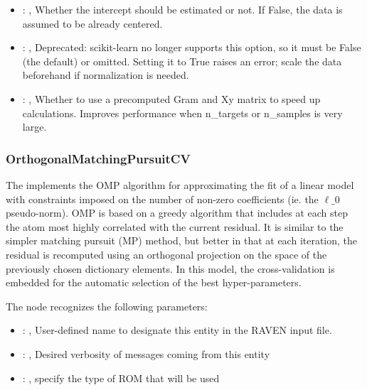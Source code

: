 \begin{itemize}
    \item {}: ,
      Whether the intercept should be estimated or not. If False,
      the data is assumed to be already centered.

    \item {}: ,
      Deprecated: scikit-learn no longer supports this option, so it must be False (the default) or
      omitted.                                                  Setting it to True raises an error;
      scale the data beforehand if normalization is needed.

    \item {}: ,
      Whether to use a precomputed Gram and Xy matrix to speed up calculations.
      Improves performance when n\_targets or n\_samples is very large.
  \end{itemize}


\subsubsection{OrthogonalMatchingPursuitCV}
  The                          implements the OMP algorithm for
  approximating the fit of a                         linear model with constraints imposed on the
  number of non-zero                         coefficients (ie. the $\ell\_0$ pseudo-norm). OMP is
  based on a greedy                         algorithm that includes at each step the atom most
  highly correlated                         with the current residual. It is similar to the simpler
  matching                         pursuit (MP) method, but better in that at each iteration, the
  residual                         is recomputed using an orthogonal projection on the space of the
  previously chosen dictionary elements.                         In this model, the cross-validation
  is embedded for the automatic selection                         of the best hyper-parameters.

  The  node recognizes the following parameters:
    \begin{itemize}
      \item {}: ,
        User-defined name to designate this entity in the RAVEN input file.
      \item {}: ,
        Desired verbosity of messages coming from this entity
      \item {}: ,
        specify the type of ROM that will be used
  \end{itemize}

